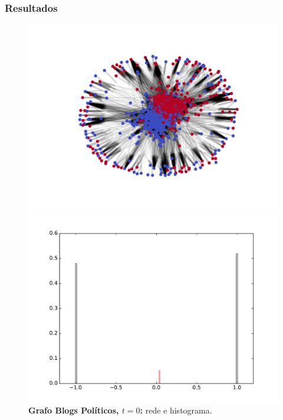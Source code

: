 \begin{frame}
  \frametitle{Resultados}

  \begin{figure}
  \centering
  \begin{minipage}{5.5cm}
    \includegraphics[width=\textwidth]{./figures/99N000}
  \end{minipage}
  \begin{minipage}{5.5cm}
    \includegraphics[width=\textwidth]{./figures/99H000}
  \end{minipage}
  \vspace{5mm}
  \caption*{\textbf{Grafo Blogs Políticos, $t = 0$:} rede e histograma.}
  \end{figure}
\end{frame}

